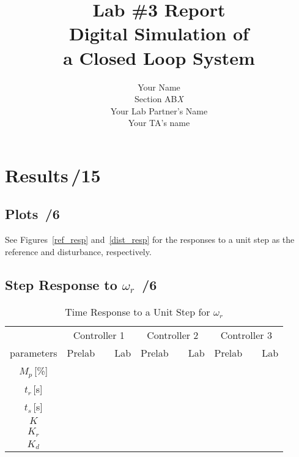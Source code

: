 \documentclass{article}
\title{\bf Lab \#3 Report\\{\sc Digital Simulation of \\ a Closed Loop System}}
\author{Your Name\\ Section AB\emph{X}\\
Your Lab Partner's Name\\
Your TA's name}
\newcommand{\score}{\hfill \underline{\hspace{0.65cm}}\,/} %
\begin{document}
\maketitle
\noindent {}
\section{{\sc Results}\score 15}
\subsection{Plots \score 6}
See Figures~\ref{ref_resp} and~\ref{dist_resp} for the responses to a unit step as the reference and disturbance, respectively.


\subsection{Step Response to $\omega_r$ \score 6}
\begin{table}[phtb]\footnotesize \label{tbl:lab3_q1}
\begin{center}
\caption{Time Response to a Unit Step for $\omega_r$}
\begin{tabular}{c|m{.85cm}|m{.85cm}|m{.85cm}|m{.85cm}|m{.85cm}|m{.85cm}} \hline \hline
\cellcolor{lightgray} & \multicolumn{2}{c|}{\cellcolor{lightgray}Controller 1} & \multicolumn{2}{c|}{\cellcolor{lightgray}Controller 2}  & \multicolumn{2}{c}{\cellcolor{lightgray}Controller 3}  \\ \cline{2-7}
\multirow{-2}{*}{\cellcolor{lightgray}parameters}& Prelab & ~~Lab & Prelab & ~~Lab & Prelab &~~Lab \\ \hline
$M_p$\,[\%] & & & & & & \\ \hline
$t_r$\,[s] & & & & & & \\ \hline
$t_s$\,[s] & & & & & & \\ \hline
$K$  &\multicolumn{2}{c|}{}&\multicolumn{2}{c|}{}&\multicolumn{2}{c}{} \\ \hline
$K_r$  &\multicolumn{2}{c|}{}&\multicolumn{2}{c|}{}&\multicolumn{2}{c}{} \\ \hline
$K_d$  &\multicolumn{2}{c|}{}&\multicolumn{2}{c|}{}&\multicolumn{2}{c}{} \\ \hline
\end{tabular}
\end{center}
\end{table}
\end{document}
